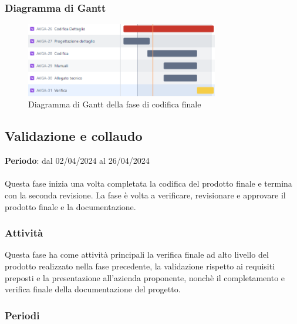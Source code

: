 \newpage 
\subsubsection{Diagramma di Gantt}\label{sec:pianificazione:progCodifica:gantt}

\begin{figure}[H]
    \centering
    \includegraphics[width=0.75\textwidth]{images/gantt_dettaglio.PNG}
    \caption{Diagramma di Gantt della fase di codifica finale}
    \label{fig:gantt_codRTB}
\end{figure}


\subsection{Validazione e collaudo}\label{sec:pianificazione:val_collaudo}

\textbf{Periodo}: dal 02/04/2024 al 26/04/2024\\\\
Questa fase inizia una volta completata la codifica del prodotto finale e termina con la seconda revisione. La fase è volta a verificare, revisionare e approvare il prodotto finale e la documentazione.

\subsubsection{Attività}\label{sec:pianificazione:val_collaudo:attivita}
Questa fase ha come attività principali la verifica finale ad alto livello del prodotto realizzato nella fase precedente, la validazione rispetto ai requisiti preposti e la presentazione all'azienda proponente, nonchè il completamento e verifica finale della documentazione del progetto.

\subsubsection{Periodi}\label{sec:pianificazione:val_collaudo:periodi}
